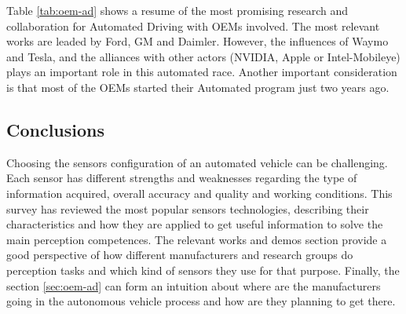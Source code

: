 Table \ref{tab:oem-ad} shows a resume of the most promising research and 
collaboration for Automated Driving with OEMs involved. The most relevant works 
are leaded by Ford, GM and Daimler. However, the influences of Waymo and Tesla, 
and the alliances with other actors (NVIDIA, Apple or Intel-Mobileye) plays an
important role in this automated race. Another important consideration is that 
most of the OEMs started their Automated program just two years ago.

\subsection{Conclusions}

Choosing the sensors configuration of an automated vehicle can be challenging.
Each sensor has different strengths and weaknesses regarding
the type of information acquired, overall accuracy and quality and working conditions. 
This survey has reviewed the most popular sensors technologies, 
describing their characteristics and how they are applied to get useful information 
to solve the main perception competences.
The relevant works and demos section provide a good perspective of how different 
manufacturers and research groups do perception tasks and which kind of sensors 
they use for that purpose. 
Finally, the section \ref{sec:oem-ad} can form an intuition about where are the 
manufacturers going in the autonomous vehicle process and how are they planning 
to get there.


